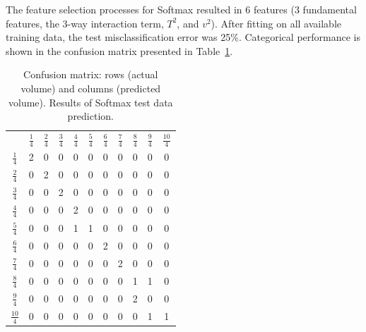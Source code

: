 \documentclass[twocolumn,10pt]{article}
\begin{document}
The feature selection processes for Softmax resulted in 6 features (3 fundamental features, the 3-way interaction term, $T^{2}$, and $v^{2}$).
After fitting on all available training data, the test misclassification error was 25\%. Categorical performance is shown in the confusion matrix presented in Table~\ref{t:confusion}.

\begin{table}
\centering
\begin{tabular}{c|c|c|c|c|c|c|c|c|c|c|}
  \multicolumn{1}{c}{\,} & \multicolumn{1}{c}{$\frac{1}{4}$}& \multicolumn{1}{c}{$\frac{2}{4}$}& \multicolumn{1}{c}{$\frac{3}{4}$}& \multicolumn{1}{c}{$\frac{4}{4}$}& \multicolumn{1}{c}{$\frac{5}{4}$}& \multicolumn{1}{c}{$\frac{6}{4}$}& \multicolumn{1}{c}{$\frac{7}{4}$}& \multicolumn{1}{c}{$\frac{8}{4}$}& \multicolumn{1}{c}{$\frac{9}{4}$}& \multicolumn{1}{c}{$\frac{10}{4}$} \\[1ex] \cline{2-11}
\multicolumn{1}{c|}{\rule{0pt}{3ex} $\frac{1}{4}$} & 2 & 0& 0& 0& 0& 0& 0& 0& 0& 0 \\[0.5ex] \cline{2-11}
\multicolumn{1}{c|}{\rule{0pt}{3ex} $\frac{2}{4}$} & 0 & 2& 0& 0& 0& 0& 0& 0& 0& 0 \\[0.5ex] \cline{2-11}
\multicolumn{1}{c|}{\rule{0pt}{3ex} $\frac{3}{4}$} & 0 & 0& 2& 0& 0& 0& 0& 0& 0& 0 \\[0.5ex] \cline{2-11}
 \multicolumn{1}{c|}{\rule{0pt}{3ex} $\frac{4}{4}$} & 0 & 0& 0& 2& 0& 0& 0& 0& 0& 0 \\[0.5ex] \cline{2-11}
 \multicolumn{1}{c|}{\rule{0pt}{3ex} $\frac{5}{4}$} & 0 & 0& 0& 1& 1& 0& 0& 0& 0& 0 \\[0.5ex] \cline{2-11}
\multicolumn{1}{c|}{\rule{0pt}{3ex} $\frac{6}{4}$} & 0 & 0& 0& 0& 0& 2& 0& 0& 0& 0 \\[0.5ex] \cline{2-11}
\multicolumn{1}{c|}{\rule{0pt}{3ex} $\frac{7}{4}$} & 0 & 0& 0& 0& 0& 0& 2& 0& 0& 0 \\[0.5ex] \cline{2-11}
\multicolumn{1}{c|}{\rule{0pt}{3ex} $\frac{8}{4}$} & 0 & 0& 0& 0& 0& 0& 0& 1& 1& 0 \\[0.5ex] \cline{2-11}
\multicolumn{1}{c|}{\rule{0pt}{3ex} $\frac{9}{4}$} & 0 & 0& 0& 0& 0& 0& 0& 2& 0& 0 \\[0.5ex] \cline{2-11}
\multicolumn{1}{c|}{\rule{0pt}{3ex} $\frac{10}{4}$} & 0 & 0& 0& 0& 0& 0& 0& 0& 1& 1 \\[0.5ex] \cline{2-11}
  \end{tabular}
  \caption{Confusion matrix: rows (actual volume) and columns (predicted volume). Results of Softmax test data prediction.}
\centering
\label{t:confusion}
\end{table}
\end{document}
